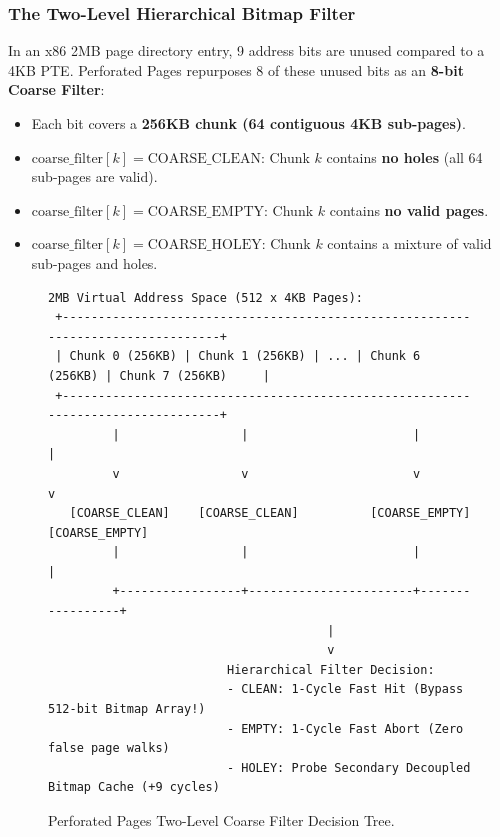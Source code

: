 \subsubsection{The Two-Level Hierarchical Bitmap Filter}
In an x86 2MB page directory entry, 9 address bits are unused compared to a 4KB PTE. Perforated Pages repurposes 8 of these unused bits as an \textbf{8-bit Coarse Filter}:
\begin{itemize}
    \item Each bit covers a \textbf{256KB chunk (64 contiguous 4KB sub-pages)}.
    \item $\text{coarse\_filter}[k] = \text{COARSE\_CLEAN}$: Chunk $k$ contains \textbf{no holes} (all 64 sub-pages are valid).
    \item $\text{coarse\_filter}[k] = \text{COARSE\_EMPTY}$: Chunk $k$ contains \textbf{no valid pages}.
    \item $\text{coarse\_filter}[k] = \text{COARSE\_HOLEY}$: Chunk $k$ contains a mixture of valid sub-pages and holes.
\end{itemize}

\begin{figure}[H]
\centering
\begin{lstlisting}[basicstyle=\ttfamily\scriptsize,frame=single]
 2MB Virtual Address Space (512 x 4KB Pages):
 +---------------------------------------------------------------------------------+
 | Chunk 0 (256KB) | Chunk 1 (256KB) | ... | Chunk 6 (256KB) | Chunk 7 (256KB)     |
 +---------------------------------------------------------------------------------+
         |                 |                       |                 |
         v                 v                       v                 v
   [COARSE_CLEAN]    [COARSE_CLEAN]          [COARSE_EMPTY]    [COARSE_EMPTY]
         |                 |                       |                 |
         +-----------------+-----------------------+-----------------+
                                       |
                                       v
                         Hierarchical Filter Decision:
                         - CLEAN: 1-Cycle Fast Hit (Bypass 512-bit Bitmap Array!)
                         - EMPTY: 1-Cycle Fast Abort (Zero false page walks)
                         - HOLEY: Probe Secondary Decoupled Bitmap Cache (+9 cycles)
\end{lstlisting}
\caption{Perforated Pages Two-Level Coarse Filter Decision Tree.}
\label{fig:perfpages_filter}
\end{figure}

